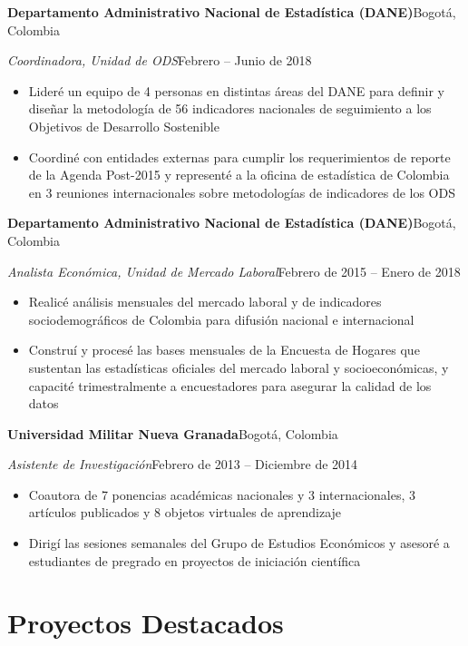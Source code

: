 \documentclass[10pt]{article}
\newcommand{\org}[2]{\noindent\textbf{#1}\hfill #2\par\vspace{0pt}}
\newcommand{\role}[2]{\noindent\textit{#1}\hfill #2\par\vspace{0pt}}
\newenvironment{cvitems}{%
  \begin{itemize}[
    leftmargin=1.2em,
    itemsep=0pt,
    parsep=0pt,
    topsep=1pt,
    label={$\bullet$}]%
}{\end{itemize}}
\newcommand{\entrygap}{\vspace{6pt}}
\begin{document}
\entrygap
\org{Departamento Administrativo Nacional de Estad\'istica (DANE)}{Bogot\'a, Colombia}
\role{Coordinadora, Unidad de ODS}{Febrero -- Junio de 2018}
\vspace{-1pt}
\begin{cvitems}
  \item Lider\'e un equipo de 4 personas en distintas \'areas del DANE para definir y dise\~nar la metodolog\'ia de 56 indicadores nacionales de seguimiento a los Objetivos de Desarrollo Sostenible
  \item Coordin\'e con entidades externas para cumplir los requerimientos de reporte de la Agenda Post-2015 y represent\'e a la oficina de estad\'istica de Colombia en 3 reuniones internacionales sobre metodolog\'ias de indicadores de los ODS
\end{cvitems}

\entrygap
\org{Departamento Administrativo Nacional de Estad\'istica (DANE)}{Bogot\'a, Colombia}
\role{Analista Econ\'omica, Unidad de Mercado Laboral}{Febrero de 2015 -- Enero de 2018}
\vspace{-1pt}
\begin{cvitems}
  \item Realic\'e an\'alisis mensuales del mercado laboral y de indicadores sociodemogr\'aficos de Colombia para difusi\'on nacional e internacional
  \item Constru\'i y proces\'e las bases mensuales de la Encuesta de Hogares que sustentan las estad\'isticas oficiales del mercado laboral y socioecon\'omicas, y capacit\'e trimestralmente a encuestadores para asegurar la calidad de los datos
\end{cvitems}

\entrygap
\org{Universidad Militar Nueva Granada}{Bogot\'a, Colombia}
\role{Asistente de Investigaci\'on}{Febrero de 2013 -- Diciembre de 2014}
\vspace{-1pt}
\begin{cvitems}
  \item Coautora de 7 ponencias acad\'emicas nacionales y 3 internacionales, 3 art\'iculos publicados y 8 objetos virtuales de aprendizaje
  \item Dirig\'i las sesiones semanales del Grupo de Estudios Econ\'omicos y asesor\'e a estudiantes de pregrado en proyectos de iniciaci\'on cient\'ifica
\end{cvitems}

\section{Proyectos Destacados}
\end{document}
